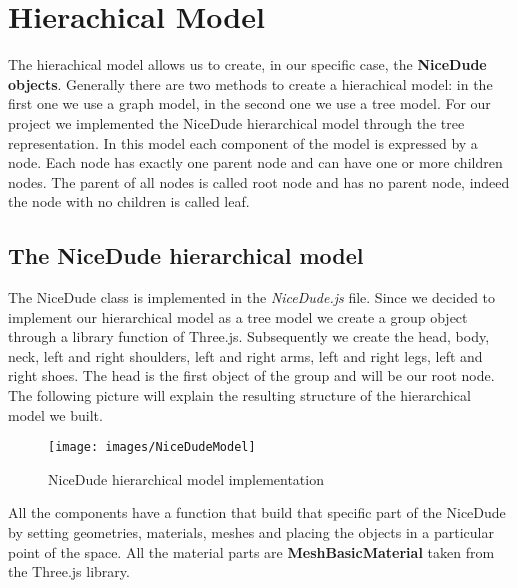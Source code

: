 \documentclass[a4paper, 11pt, titlepage]{report}
\begin{document}
\chapter{Hierachical Model}
	\par The hierachical model allows us to create, in our specific case, the \textbf{NiceDude objects}. Generally there are two methods to create a hierachical model: in the first one we use a graph model, in the second one we use a tree model.
	For our project we implemented the NiceDude hierarchical model through the tree representation. In this model each component of the model is expressed by a node. Each node has exactly one parent node and can have one or more children nodes. The parent of all nodes is called root node and has no parent node, indeed the node with no children is called leaf.
 
	\section{The NiceDude hierarchical model}
		The NiceDude class is implemented in the \emph{NiceDude.js} file. Since we decided to implement our hierarchical model as a tree model we create a group object through a library function of Three.js. Subsequently we create the head, body, neck, left and right shoulders, left and right arms, left and right legs, left and right shoes. The head is the first object of the group and will be our root node. The following picture will explain the resulting structure of the hierarchical model we built.
		\begin{figure}[h!]
			\centering
			\texttt{[image: images/NiceDudeModel]}
			\caption{NiceDude hierarchical model implementation}
		\end{figure}
		All the components have a function that build that specific part of the NiceDude by setting geometries, materials, meshes and placing the objects in a particular point of the space. All the material parts are \textbf{MeshBasicMaterial} taken from the Three.js library.

\end{document}
